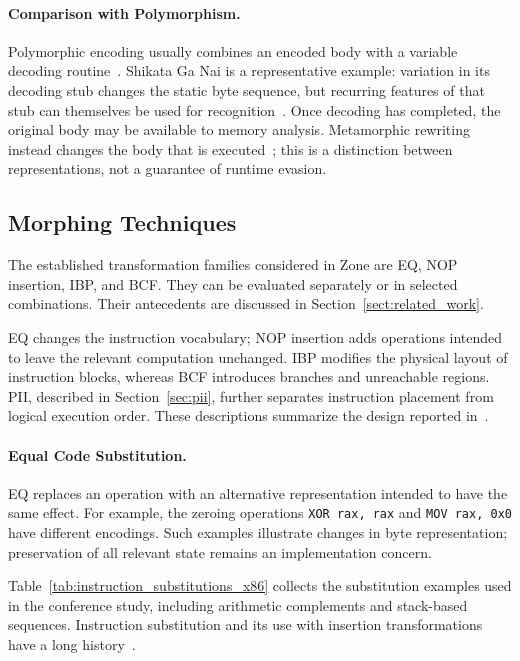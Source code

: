 \documentclass[runningheads]{llncs}
\begin{document}
\paragraph{Comparison with Polymorphism.}
Polymorphic encoding usually combines an encoded body with a variable decoding routine~\cite{historycodeobf}. Shikata Ga Nai is a representative example: variation in its decoding stub changes the static byte sequence, but recurring features of that stub can themselves be used for recognition~\cite{sgnstrong}. Once decoding has completed, the original body may be available to memory analysis. Metamorphic rewriting instead changes the body that is executed~\cite{codeExtraction}; this is a distinction between representations, not a guarantee of runtime evasion.

\subsection{Morphing Techniques}
The established transformation families considered in Zone are EQ, NOP insertion, IBP, and BCF. They can be evaluated separately or in selected combinations. Their antecedents are discussed in Section~\ref{sect:related_work}.

EQ changes the instruction vocabulary; NOP insertion adds operations intended to leave the relevant computation unchanged. IBP modifies the physical layout of instruction blocks, whereas BCF introduces branches and unreachable regions. PII, described in Section~\ref{sec:pii}, further separates instruction placement from logical execution order. These descriptions summarize the design reported in~\cite{zone_secrypt_2026}.

\paragraph{Equal Code Substitution.}
EQ replaces an operation with an alternative representation intended to have the same effect. For example, the zeroing operations \texttt{XOR rax, rax} and \texttt{MOV rax, 0x0} have different encodings. Such examples illustrate changes in byte representation; preservation of all relevant state remains an implementation concern.

Table~\ref{tab:instruction_substitutions_x86} collects the substitution examples used in the conference study, including arithmetic complements and stack-based sequences. Instruction substitution and its use with insertion transformations have a long history~\cite{desai2008towards,desai2010highly,szor2001hunting}.
\end{document}
